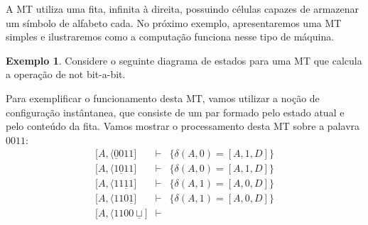 \documentclass[a4paper]{article}
\theoremstyle{definition}
\newtheorem{Example}{Exemplo}
\begin{document}
  A MT utiliza uma fita, infinita à direita, possuindo células capazes de
  armazenar um símbolo de alfabeto cada. No próximo exemplo, apresentaremos
  uma MT simples e ilustraremos como a computação funciona nesse tipo de
  máquina.

  \begin{Example}
    Considere o seguinte diagrama de estados para uma MT que calcula a operação
    de not bit-a-bit.
    \begin{figure}[H]
      \centering
    \end{figure}
    Para exemplificar o funcionamento desta MT, vamos utilizar a noção de
    configuração instântanea, que consiste de um par formado pelo estado atual e
    pelo conteúdo da fita. Vamos mostrar o processamento desta MT sobre a
    palavra $0011$:
    \[
      \begin{array}{lcl}
        \lbrack A,\langle \underline{0}011 \rbrack & \vdash & \{\delta(A,0) =
                                                              [A,1,D]\}\\
        \lbrack A, \langle 1 \underline{0}11 \rbrack & \vdash & \{\delta(A,0) =
                                                                [A,1,D]\} \\
        \lbrack A, \langle  11 \underline{1}1 \rbrack & \vdash & \{\delta(A,1) =
                                                                 [A,0,D]\} \\
        \lbrack A, \langle  110\underline{1}\rbrack & \vdash & \{\delta(A,1) =
                                                               [A,0,D]\} \\
        \lbrack A , \langle 1100 \underline{\sqcup} \rbrack & \vdash &

\end{array}\]
\end{Example}
\end{document}
